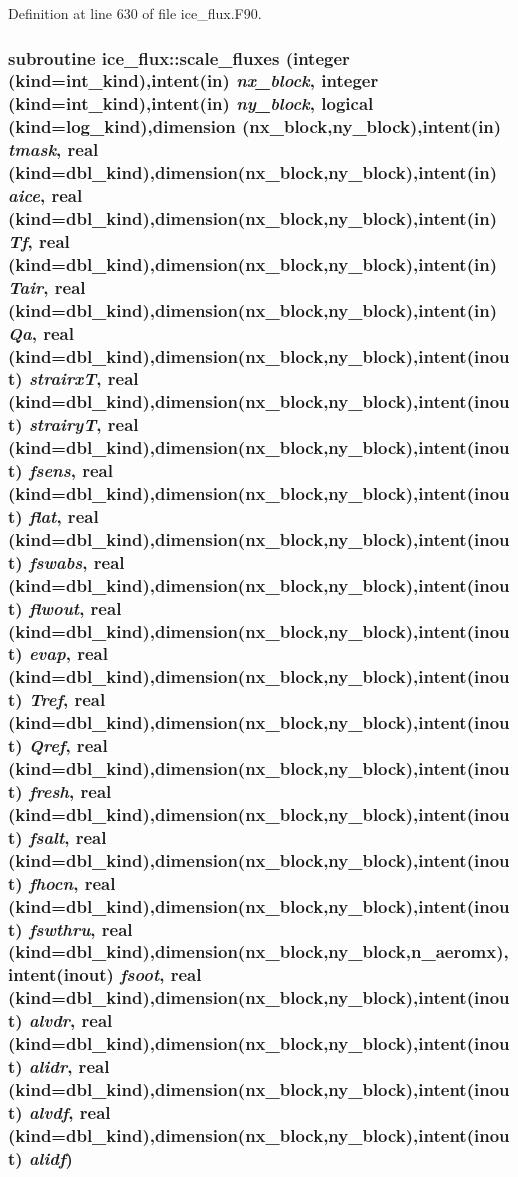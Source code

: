 Definition at line 630 of file ice\_\-flux.F90.\hypertarget{namespaceice__flux_a66344c677dd9f73743df68dcf3d203d9}{
\subsubsection[{scale\_\-fluxes}]{\setlength{\rightskip}{0pt plus 5cm}subroutine ice\_\-flux::scale\_\-fluxes (integer (kind=int\_\-kind),intent(in) {\em nx\_\-block}, \/  integer (kind=int\_\-kind),intent(in) {\em ny\_\-block}, \/  logical (kind=log\_\-kind),dimension (nx\_\-block,ny\_\-block),intent(in) {\em tmask}, \/  real (kind=dbl\_\-kind),dimension(nx\_\-block,ny\_\-block),intent(in) {\em aice}, \/  real (kind=dbl\_\-kind),dimension(nx\_\-block,ny\_\-block),intent(in) {\em Tf}, \/  real (kind=dbl\_\-kind),dimension(nx\_\-block,ny\_\-block),intent(in) {\em Tair}, \/  real (kind=dbl\_\-kind),dimension(nx\_\-block,ny\_\-block),intent(in) {\em Qa}, \/  real (kind=dbl\_\-kind),dimension(nx\_\-block,ny\_\-block),intent(inout) {\em strairxT}, \/  real (kind=dbl\_\-kind),dimension(nx\_\-block,ny\_\-block),intent(inout) {\em strairyT}, \/  real (kind=dbl\_\-kind),dimension(nx\_\-block,ny\_\-block),intent(inout) {\em fsens}, \/  real (kind=dbl\_\-kind),dimension(nx\_\-block,ny\_\-block),intent(inout) {\em flat}, \/  real (kind=dbl\_\-kind),dimension(nx\_\-block,ny\_\-block),intent(inout) {\em fswabs}, \/  real (kind=dbl\_\-kind),dimension(nx\_\-block,ny\_\-block),intent(inout) {\em flwout}, \/  real (kind=dbl\_\-kind),dimension(nx\_\-block,ny\_\-block),intent(inout) {\em evap}, \/  real (kind=dbl\_\-kind),dimension(nx\_\-block,ny\_\-block),intent(inout) {\em Tref}, \/  real (kind=dbl\_\-kind),dimension(nx\_\-block,ny\_\-block),intent(inout) {\em Qref}, \/  real (kind=dbl\_\-kind),dimension(nx\_\-block,ny\_\-block),intent(inout) {\em fresh}, \/  real (kind=dbl\_\-kind),dimension(nx\_\-block,ny\_\-block),intent(inout) {\em fsalt}, \/  real (kind=dbl\_\-kind),dimension(nx\_\-block,ny\_\-block),intent(inout) {\em fhocn}, \/  real (kind=dbl\_\-kind),dimension(nx\_\-block,ny\_\-block),intent(inout) {\em fswthru}, \/  real (kind=dbl\_\-kind),dimension(nx\_\-block,ny\_\-block,n\_\-aeromx),intent(inout) {\em fsoot}, \/  real (kind=dbl\_\-kind),dimension(nx\_\-block,ny\_\-block),intent(inout) {\em alvdr}, \/  real (kind=dbl\_\-kind),dimension(nx\_\-block,ny\_\-block),intent(inout) {\em alidr}, \/  real (kind=dbl\_\-kind),dimension(nx\_\-block,ny\_\-block),intent(inout) {\em alvdf}, \/  real (kind=dbl\_\-kind),dimension(nx\_\-block,ny\_\-block),intent(inout) {\em alidf})}}
\label{namespaceice__flux_a66344c677dd9f73743df68dcf3d203d9}


